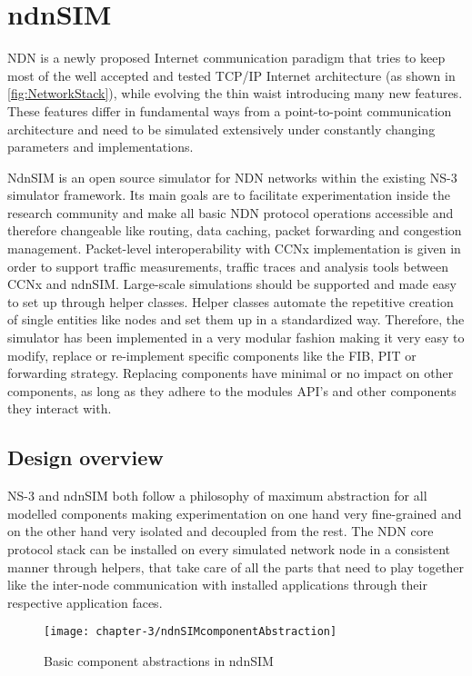 \chapter{ndnSIM}

NDN is a newly proposed Internet communication paradigm that tries to keep most of the well accepted and tested TCP/IP Internet architecture (as shown in \ref{fig:NetworkStack}), while evolving the thin waist introducing many new features. These features differ in fundamental ways from a point-to-point communication architecture and need to be simulated extensively under constantly changing parameters and implementations.

NdnSIM is an open source simulator for NDN networks within the existing NS-3 simulator framework. Its main goals are to facilitate experimentation inside the research community and make all basic NDN protocol operations accessible and therefore changeable like routing, data caching, packet forwarding and congestion management. Packet-level interoperability with CCNx implementation is given in order to support traffic measurements, traffic traces and analysis tools between CCNx and ndnSIM. Large-scale simulations should be supported and made easy to set up through helper classes. Helper classes automate the repetitive creation of single entities like nodes and set them up in a standardized way. Therefore, the simulator has been implemented in a very modular fashion making it very easy to modify, replace or re-implement specific components like the FIB, PIT or forwarding strategy. Replacing components have minimal or no impact on other components, as long as they adhere to the modules API's and other components they interact with.

\section{Design overview}

NS-3 and ndnSIM both follow a philosophy of maximum abstraction for all modelled components making experimentation on one hand very fine-grained and on the other hand very isolated and decoupled from the rest. The NDN core protocol stack can be installed on every simulated network node in a consistent manner through helpers, that take care of all the parts that need to play together like the inter-node communication with installed applications through their respective application faces.

\begin{figure}[H]
  \centering
  \texttt{[image: chapter-3/ndnSIMcomponentAbstraction]}
  \caption{Basic component abstractions in ndnSIM}
  \label{fig:ndnSIMcomponentAbstraction}
\end{figure}


